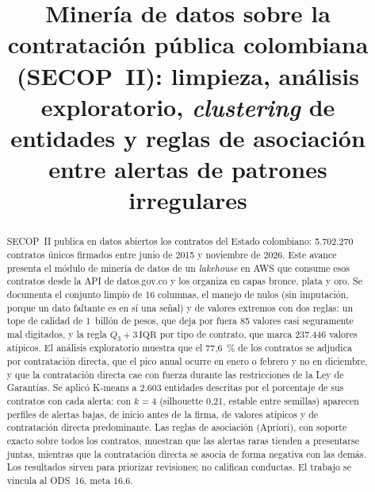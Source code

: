 \documentclass[conference,a4paper]{IEEEtran}
\begin{document}
\title{Minería de datos sobre la contratación pública colombiana (SECOP~II): limpieza, análisis exploratorio,
\emph{clustering} de entidades y reglas de asociación entre alertas de patrones irregulares}

\author{
}

\maketitle

\begin{abstract}
SECOP~II publica en datos abiertos los contratos del Estado colombiano: 5.702.270 contratos únicos firmados
entre junio de 2015 y noviembre de 2026. Este avance presenta el módulo de minería de datos de un
\emph{lakehouse} en AWS que consume esos contratos desde la API de datos.gov.co y los organiza en capas bronce,
plata y oro. Se documenta el conjunto limpio de 16 columnas, el manejo de nulos (sin imputación, porque un dato
faltante es en sí una señal) y de valores extremos con dos reglas: un tope de calidad de 1~billón de pesos, que
deja por fuera 85 valores casi seguramente mal digitados, y la regla $Q_3+3\,\mathrm{IQR}$ por tipo de contrato, que
marca 237.446 valores atípicos. El análisis exploratorio muestra que el 77,6~\% de los contratos se adjudica por
contratación directa, que el pico anual ocurre en enero o febrero y no en diciembre, y que la contratación
directa cae con fuerza durante las restricciones de la Ley de Garantías. Se aplicó K-means a 2.603 entidades
descritas por el porcentaje de sus contratos con cada alerta: con $k=4$ (silhouette 0,21, estable entre
semillas) aparecen perfiles de alertas bajas, de inicio antes de la firma, de valores atípicos y de contratación
directa predominante. Las reglas de asociación (Apriori), con soporte exacto sobre todos los contratos, muestran
que las alertas raras tienden a presentarse juntas, mientras que la contratación directa se asocia de forma
negativa con las demás. Los resultados sirven para priorizar revisiones; no califican conductas. El trabajo se
vincula al ODS~16, meta 16.6.
\end{abstract}
\end{document}
